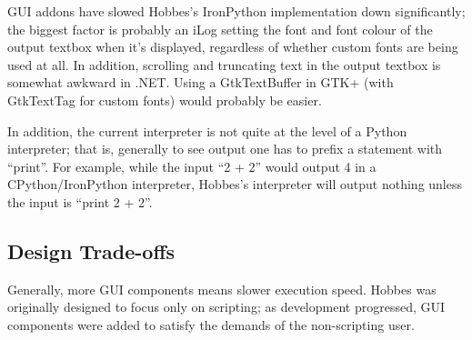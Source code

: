\documentclass[12pt,letterpaper]{article}
\begin{document}
GUI addons have slowed Hobbes's IronPython implementation down significantly; the biggest factor is probably an iLog setting the font and font colour of the output textbox when it's displayed, regardless of whether custom fonts are being used at all. In addition, scrolling and truncating text in the output textbox is somewhat awkward in .NET. Using a GtkTextBuffer in GTK+ (with GtkTextTag for custom fonts) would probably be easier.

In addition, the current interpreter is not quite at the level of a Python interpreter; that is, generally to see output one has to prefix a statement with ``print''. For example, while the input ``2 + 2'' would output 4 in a CPython/IronPython interpreter, Hobbes's interpreter will output nothing unless the input is ``print 2 + 2''.





%
%
\subsection{Design Trade-offs}
\label{1.6}

Generally, more GUI components means slower execution speed. Hobbes was originally designed to focus only on scripting; as development progressed, GUI components were added to satisfy the demands of the non-scripting user.
\end{document}
